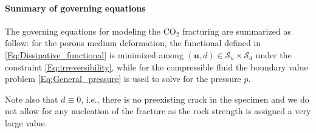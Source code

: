 
\paragraph{Summary of governing equations} The governing equations for modeling the CO$_2$ fracturing are summarized as follow: for the porous medium deformation, the functional defined in \eqref{Eq:Dissipative_functional} is minimized among $(\bm{u},d)\in \mathscr{S}_u\times\mathscr{S}_d$ under the constraint \eqref{Eq:irreversibility}, while %
for the compressible fluid the boundary value problem \eqref{Eq:General_pressure} is used to solve for the pressure $p$.

Note also that $d\equiv0$, i.e., there is no preexisting crack in the specimen and we do not allow for any nucleation of the fracture as the rock strength is assigned a very large value.
